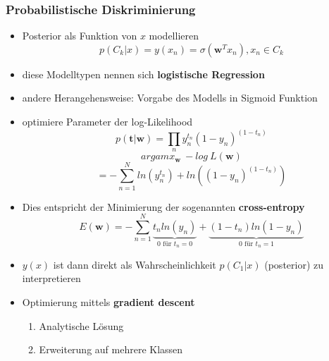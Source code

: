 	\subsubsection{Probabilistische Diskriminierung}
	\begin{itemize}
		\item Posterior als Funktion von $x$ modellieren
		\begin{equation*}
			p(C_k\vert x) = y(x_n) = \sigma(\pmb{w}^Tx_n), x_n \in C_k
		\end{equation*}
		\item diese Modelltypen nennen sich \textbf{logistische Regression}
		\item andere Herangehensweise: Vorgabe des Modells in Sigmoid Funktion
		\item optimiere Parameter der log-Likelihood
		\begin{equation*}
			p(\pmb{t} \vert \pmb{w}) = \prod_n y_n^{t_n}(1-y_n)^{(1-t_n)}
		\end{equation*}
		\begin{equation*}
			argamx_{\pmb{w}}~-log~L(\pmb{w})
		\end{equation*}
		\begin{equation*}
			 = -\sum_{n=1}^N ln(y_n^{t_n})+ ln((1-y_n)^{(1-t_n)})
		\end{equation*}
		\item Dies entspricht der Minimierung der sogenannten \textbf{cross-entropy}
		\begin{equation*}
			E(\pmb{w}) = -\sum_{n=1}^N \underbrace{t_nln(y_n)}_\text{0 für $t_n = 0$}+ \underbrace{(1-t_n)ln(1-y_n)}_\text{0 für $t_n=1$}
		\end{equation*}
		\item $y(x)$ ist dann direkt als Wahrscheinlichkeit $p(C_1\vert x)$ (posterior) zu interpretieren
		\item Optimierung mittels \textbf{gradient descent}\vspace*{-3pt}
		\begin{enumerate}[$\hookrightarrow$]
			\item Analytische Lösung
			\item Erweiterung auf mehrere Klassen
		\end{enumerate}
	\end{itemize}
\newpage
